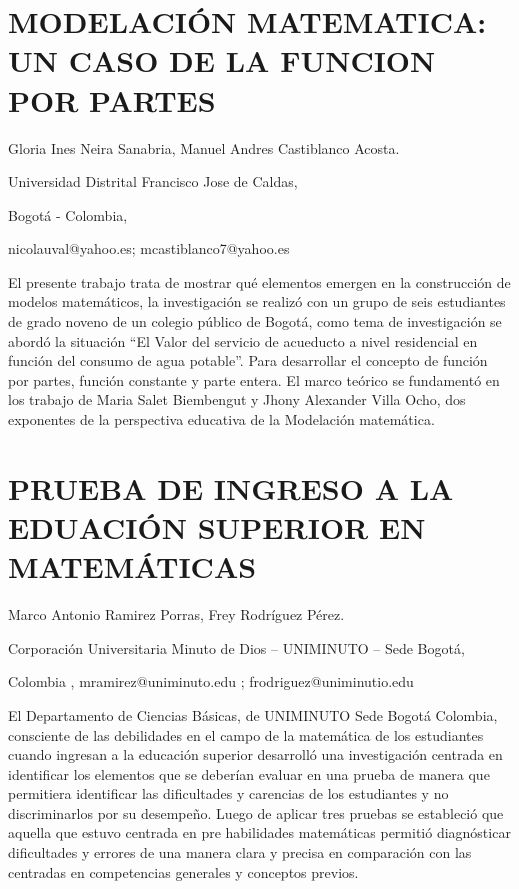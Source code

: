 \section{MODELACIÓN MATEMATICA: UN CASO DE LA FUNCION POR PARTES}

\begin{datos}

Gloria Ines Neira Sanabria, Manuel Andres Castiblanco Acosta.

Universidad Distrital Francisco Jose de Caldas,

Bogotá - Colombia,

nicolauval@yahoo.es; mcastiblanco7@yahoo.es

\end{datos}

El presente trabajo trata de mostrar qué elementos emergen en la construcción
de modelos matemáticos, la investigación se realizó con un grupo de
seis estudiantes de grado noveno de un colegio público de Bogotá,
como tema de investigación se abordó la situación “El Valor del servicio
de acueducto a nivel residencial en función del consumo de agua potable”.
Para desarrollar el concepto de función por partes, función constante
y parte entera. El marco teórico se fundamentó en los trabajo de Maria
Salet Biembengut y Jhony Alexander Villa Ocho, dos exponentes de la
perspectiva educativa de la Modelación matemática.


\section{PRUEBA DE INGRESO A LA EDUACIÓN SUPERIOR EN MATEMÁTICAS}

\begin{datos}

Marco Antonio Ramirez Porras, Frey Rodríguez Pérez.

Corporación Universitaria Minuto de Dios – UNIMINUTO – Sede Bogotá,

Colombia , mramirez@uniminuto.edu ; frodriguez@uniminutio.edu

\end{datos}

El Departamento de Ciencias Básicas, de UNIMINUTO Sede Bogotá Colombia,
consciente de las debilidades en el campo de la matemática de los
estudiantes cuando ingresan a la educación superior desarrolló una
investigación centrada en identificar los elementos que se deberían
evaluar en una prueba de manera que permitiera identificar las dificultades
y carencias de los estudiantes y no discriminarlos por su desempeño.
Luego de aplicar tres pruebas se estableció que aquella que estuvo
centrada en pre habilidades matemáticas permitió diagnósticar dificultades
y errores de una manera clara y precisa en comparación con las centradas
en competencias generales y conceptos previos. 


